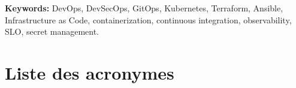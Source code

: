 \documentclass[12pt,a4paper,twoside,openright]{report}
\makeatletter
\def\cleardoublepage{\clearpage\if@twoside
  \ifodd\c@page\else\hbox{}\thispagestyle{empty}\newpage\fi\fi}
\makeatother
\begin{document}
\vspace{0.6cm}
\noindent\textbf{Keywords:} DevOps, DevSecOps, GitOps, Kubernetes, Terraform, Ansible,
Infrastructure as Code, containerization, continuous integration, observability, SLO,
secret management.

\cleardoublepage

\tableofcontents
\cleardoublepage
\listoffigures
{}
\cleardoublepage
\listoftables
{}
\cleardoublepage

\chapter*{Liste des acronymes}
\end{document}
